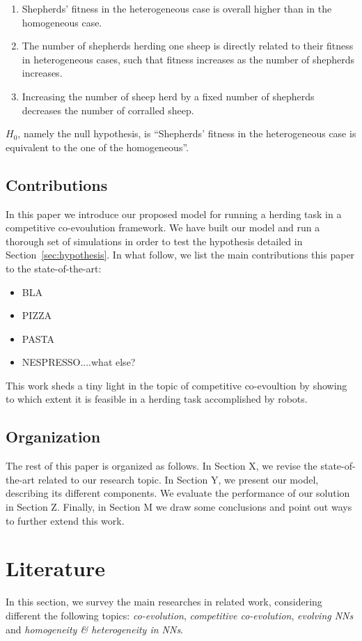 \documentclass[conference]{IEEEtran}
\begin{document}
\begin{enumerate}
	\item Shepherds' fitness in the heterogeneous case is overall higher than in the homogeneous case.
	\item The number of shepherds herding one sheep is directly related to their fitness in heterogeneous cases, such that fitness increases as the number of shepherds increases.	
	\item Increasing the number of sheep herd by a fixed number of shepherds decreases the number of corralled sheep.
\end{enumerate}
$H_0$, namely the null hypothesis, is ``Shepherds’ fitness in the heterogeneous case is equivalent to the one of the homogeneous''.

\subsection{Contributions}
In this paper we introduce our proposed model for running a herding task in a competitive co-evoulution framework. 
We have built our model and run a thorough set of simulations in order to test the hypothesis detailed in Section~\ref{sec:hypothesis}. 
In what follow, we list the main contributions this paper to the state-of-the-art:
\begin{itemize}
	\item BLA
	\item PIZZA
	\item PASTA
	\item NESPRESSO....what else?
\end{itemize}

This work sheds a tiny light in the topic of competitive co-evoultion by showing to which extent it is feasible in a herding task accomplished by robots.

\subsection{Organization}
The rest of this paper is organized as follows. 
In Section X, we revise the state-of-the-art related to our research topic. 
In Section Y, we present our model, describing its different components. 
We evaluate the performance of our solution in Section Z. 
Finally, in Section M we draw some conclusions and point out ways to further extend this work.

\section{Literature}
In this section, we survey the main researches in related work, considering different the following topics: \textit{co-evolution}, \textit{competitive co-evolution}, \textit{evolving NNs} and \textit{homogeneity \& heterogeneity in NNs}.
 
\end{document}
